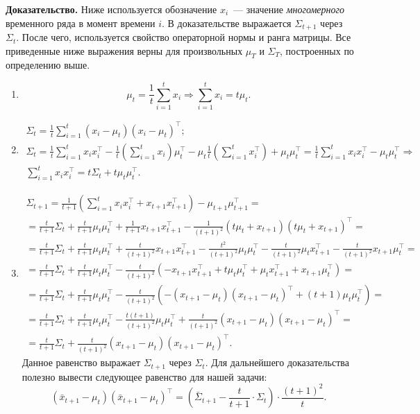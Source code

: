 \documentclass{article}
\begin{document}
\textbf{Доказательство.}
Ниже используется обозначение $x_i$~--- значение \textit{многомерного} временного ряда в момент времени $i$. В доказательстве выражается $\Sigma_{t+1}$ через $\Sigma_t$. После чего, используется свойство операторной нормы и ранга матрицы. Все приведенные ниже выражения верны для произвольных $\mu_T$ и $\Sigma_T$, построенных по определению выше.
\begin{enumerate}
	\item \[\mu_t = \frac{1}{t} \sum_{i=1}^{t} x_i \Rightarrow \sum_{i=1}^{t} x_i = t \mu_t.\]
	\item 
		\begin{gather*}
		\Sigma_t = \frac{1}{t} \sum_{i=1}^{t} (x_i-\mu_t)(x_i-\mu_t)^\intercal;\\
		\Sigma_t = \frac{1}{t} \sum_{i=1}^{t} x_i x_i^\intercal - \frac{1}{t} \left( \sum_{i=1}^{t} x_i\right) \mu_t^\intercal - \mu_t \frac{1}{t} \left( \sum_{i=1}^{t} x_i^\intercal\right) + \mu_t \mu_t^\intercal = \frac{1}{t} \sum_{i=1}^{t} x_i x_i^\intercal - \mu_t \mu_t^\intercal \Rightarrow\\
		\sum_{i=1}^{t} x_i x_i^\intercal = t \Sigma_t + t \mu_t \mu_t^\intercal.
		\end{gather*}
	\item 
	\begin{gather*}
		\Sigma_{t+1} = \frac{1}{t+1} \left(\sum_{i=1}^{t} x_i x_i^\intercal + x_{t+1} x_{t+1}^\intercal \right) - \mu_{t+1} \mu_{t+1}^\intercal = \\
		= \frac{t}{t+1}\Sigma_t + \frac{t}{t+1}\mu_{t} \mu_{t}^\intercal + \frac{1}{t+1} x_{t+1} x_{t+1}^\intercal - \frac{1}{(t+1)^2} (t \mu_t + x_{t+1})(t \mu_t + x_{t+1})^\intercal =\\
		= \frac{t}{t+1}\Sigma_t + \frac{t}{t+1}\mu_{t} \mu_{t}^\intercal + \frac{t}{(t+1)^2} x_{t+1} x_{t+1}^\intercal - \frac{t^2}{(t+1)^2}\mu_{t} \mu_{t}^\intercal - \frac{t}{(t+1)^2}\mu_{t} x_{t+1}^\intercal - \frac{t}{(t+1)^2}x_{t+1} \mu_{t}^\intercal =\\
		= \frac{t}{t+1}\Sigma_t + \frac{t}{t+1}\mu_{t} \mu_{t}^\intercal - \frac{t}{(t+1)^2} \left( -x_{t+1} x_{t+1}^\intercal + t\mu_{t} \mu_{t}^\intercal + \mu_{t} x_{t+1}^\intercal + x_{t+1} \mu_{t}^\intercal \right) =\\
		= \frac{t}{t+1}\Sigma_t + \frac{t}{t+1}\mu_{t} \mu_{t}^\intercal - \frac{t}{(t+1)^2} \left( -(x_{t+1}-\mu_t)(x_{t+1}-\mu_t)^\intercal + (t+1)\mu_{t} \mu_{t}^\intercal \right) =\\
		= \frac{t}{t+1}\Sigma_t + \frac{t}{t+1}\mu_{t} \mu_{t}^\intercal - \frac{t(t+1)}{(t+1)^2}\mu_{t} \mu_{t}^\intercal + \frac{t}{(t+1)^2}(x_{t+1}-\mu_t)(x_{t+1}-\mu_t)^\intercal =\\
		= \frac{t}{t+1}\Sigma_t + \frac{t}{(t+1)^2}(x_{t+1}-\mu_t)(x_{t+1}-\mu_t)^\intercal.
	\end{gather*}
	Данное равенство выражает $\Sigma_{t+1}$ через $\Sigma_t$. Для дальнейшего доказательства полезно вывести следующее равенство для нашей задачи: \[(\bar{x}_{t+1}-\mu_t)(\bar{x}_{t+1}-\mu_t)^\intercal = \left(\bar{\Sigma}_{t+1} - \frac{t}{t+1} \cdot \Sigma_t \right) \cdot \frac{(t+1)^2}{t}.\]
	

\end{enumerate}
\end{document}
